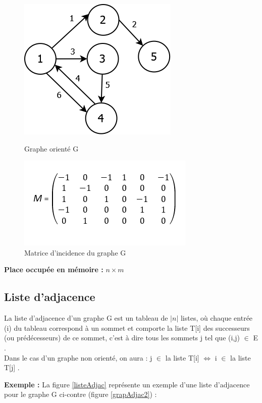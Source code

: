 \begin{figure}[H]
	\begin{minipage}[c]{.46\linewidth}
	\begin{center}
		\includegraphics[height=100 pt, width=110 pt]{./ressources/image/graphIncid.png} 
		\caption{Graphe orienté G}
		\label{grapIncid}
	\end{center}
	\end{minipage} 
	\begin{minipage}[c]{.46\linewidth}
	\begin{center}
		\includegraphics[height=110 pt, width=140 pt]{./ressources/image/matriceIncid.png} 
		\caption{Matrice d'incidence du graphe G}
		\label{matriceIncid}
	\end{center}
	\end{minipage} 
\end{figure}

\textbf{Place occupée en mémoire :} $n \times m$
		
		\subsection{Liste d'adjacence}
			La liste d'adjacence d'un graphe G est un tableau de $|n|$ listes, où chaque entrée (i) du tableau correspond à un sommet et comporte la liste T[i] des successeurs (ou prédécesseurs) de ce sommet, c'est à dire tous les sommets j tel que (i,j) $\in$ E \citep{mathieu}.\\
Dans le cas d'un graphe non orienté, on aura : j $\in$ la liste T[i]  $\iff$ i $\in$ la liste T[j] \citep{IUTLyonInformatique}.

\textbf{Exemple :} La figure \ref{listeAdjac} représente 					un exemple d'une liste d'adjacence pour le graphe G ci-contre 			(figure \ref{grapAdjac2}) :
			

